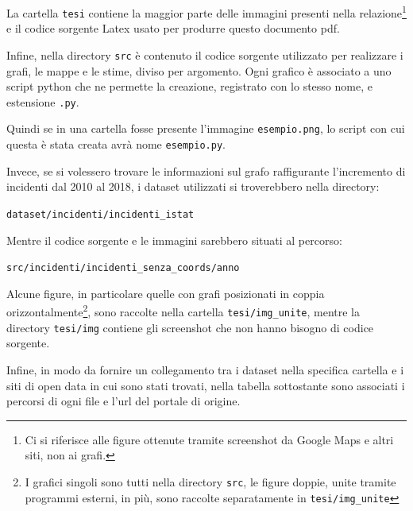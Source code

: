 \documentclass[a4paper,12pt]{report}
\newcommand{\columnstyle}[1]{\texttt{#1}}
\newcommand{\filenamestyle}[1]{\texttt{#1}}
\newcommand{\skipline}{\vspace{0.2in}}
\begin{document}
La cartella \columnstyle{tesi} contiene la maggior parte delle immagini presenti 
nella relazione\footnote{Ci si riferisce alle figure ottenute tramite screenshot 
da Google Maps e altri siti, non ai grafi.} 
e il codice sorgente Latex usato per produrre questo documento pdf. 

Infine, nella directory \filenamestyle{src} è contenuto il codice sorgente utilizzato 
per realizzare i grafi, le mappe e le stime, diviso per argomento. 
Ogni grafico è associato a uno script python che ne permette la creazione, registrato con 
lo stesso nome, e estensione \filenamestyle{.py}. 

Quindi se in una cartella fosse presente l'immagine \filenamestyle{esempio.png}, lo script con 
cui questa è stata creata avrà nome \filenamestyle{esempio.py}. 

Invece, se si volessero trovare le informazioni sul grafo raffigurante 
l'incremento di incidenti 
dal 2010 al 2018, i dataset utilizzati si troverebbero nella directory:

\skipline
\indent\filenamestyle{dataset/incidenti/incidenti\_istat}

\skipline
\noindent Mentre il codice sorgente e le immagini sarebbero situati al percorso:

\skipline
\indent\filenamestyle{src/incidenti/incidenti\_senza\_coords/anno}

\skipline
Alcune figure, in particolare quelle con grafi posizionati in coppia 
orizzontalmente\footnote{I grafici singoli sono tutti nella directory \filenamestyle{src}, 
le figure doppie, unite tramite programmi esterni, in più, sono raccolte separatamente 
in \filenamestyle{tesi/img\_unite}}, 
sono raccolte nella cartella \filenamestyle{tesi/img\_unite}, 
mentre la directory \filenamestyle{tesi/img} contiene gli screenshot 
che non hanno bisogno di codice sorgente. 

Infine, in modo da fornire un collegamento tra i dataset nella specifica cartella e i siti 
di open data in cui sono stati trovati, nella tabella sottostante sono associati i percorsi di 
ogni file e l'url del portale di origine. 
\end{document}
